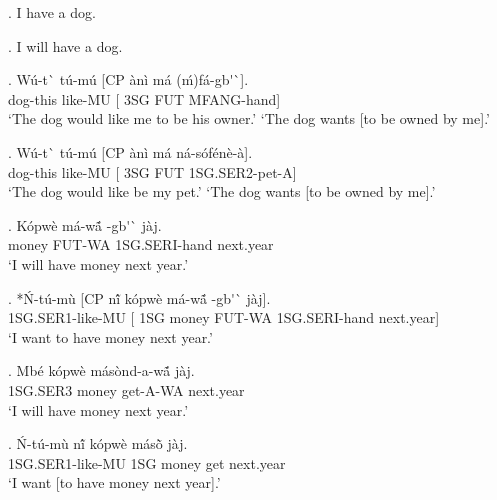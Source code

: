 \documentclass{assets/fieldnotes}
\begin{document}


\ex. I have a dog. 

\ex. I will have a dog.

\exg. W\'{u}-t\`{} t\'{u}-m\'{u} [CP \`{a}n\`{i} m\'{a} (\'{m})f\'{a}-gb\'{}\`{}]. \\
dog-this like-MU [ 3SG FUT MFANG-hand] \\
`The dog would like me to be his owner.' \newline
`The dog wants [to be owned by me].' 


\exg. W\'{u}-t\`{} t\'{u}-m\'{u} [CP \`{a}n\`{i} m\'{a} n\'{a}-s\'{o}f\'{e}n\`{e}-\`{a}]. \\
dog-this like-MU [ 3SG FUT 1SG.SER2-pet-A] \\
`The dog would like be my pet.' \newline
`The dog wants [to be owned by me].'


\exg. K\'{o}pw\`{e} m\'{a}-wã́ -gb\'{}\`{} j\`{a}j.  \\
money FUT-WA 1SG.SERI-hand next.year \\
`I will have money next year.'

\exg. *\'{N}-t\'{u}-m\`{u} [CP nĩ́  k\'{o}pw\`{e} m\'{a}-wã́ -gb\'{}\`{} j\`{a}j].  \\
1SG.SER1-like-MU [ 1SG money FUT-WA 1SG.SERI-hand next.year] \\
`I want to have money next year.' 

\exg. Mb\'{e} k\'{o}pw\`{e} m\'{a}s\`{o}nd-a-wã́ j\`{a}j.  \\
1SG.SER3 money get-A-WA next.year \\
`I will have money next year.'

\exg. \'{N}-t\'{u}-m\`{u} nĩ́ k\'{o}pw\`{e} m\'{a}sõ̀ j\`{a}j.  \\
1SG.SER1-like-MU 1SG money get next.year \\
`I want [to have money next year].' 
\end{document}
